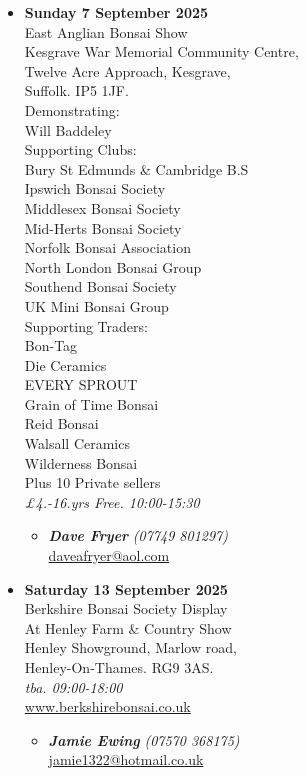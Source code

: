 \begin{itemize}
    \item \textbf{Sunday 7 September 2025}
    \\
    East Anglian Bonsai Show \\
    Kesgrave War Memorial Community Centre, \\
    Twelve Acre Approach, Kesgrave, \\
    Suffolk. IP5 1JF. \\
    Demonstrating: \\
    Will Baddeley \\
    Supporting Clubs: \\
    Bury St Edmunds \& Cambridge B.S \\
    Ipswich Bonsai Society \\
    Middlesex Bonsai Society \\
    Mid-Herts Bonsai Society \\
    Norfolk Bonsai Association \\
    North London Bonsai Group \\
    Southend Bonsai Society \\
    UK Mini Bonsai Group \\
    Supporting Traders: \\
    Bon-Tag \\
    Die Ceramics \\
    EVERY SPROUT \\
    Grain of Time Bonsai \\
    Reid Bonsai \\
    Walsall Ceramics \\
    Wilderness Bonsai \\
    Plus 10 Private sellers
    \\
    \emph{£4.-16.yrs Free. 10:00-15:30}
    \begin{itemize}
        \item \textbf{\emph{Dave Fryer}} \emph{(07749 801297)} \\
        \href{mailto:daveafryer@aol.com}{daveafryer@aol.com} 
    \end{itemize}

    \item \textbf{Saturday 13 September 2025}
    \\
    Berkshire Bonsai Society Display \\
    At Henley Farm \& Country Show \\
    Henley Showground, Marlow road, \\
    Henley-On-Thames. RG9 3AS.
    \\
    \emph{tba. 09:00-18:00}
    \\
    \href{http://www.berkshirebonsai.co.uk/}{www.berkshirebonsai.co.uk}
    \begin{itemize}
        \item \textbf{\emph{Jamie Ewing}} \emph{(07570 368175)} \\
        \href{mailto:jamie1322@hotmail.co.uk}{jamie1322@hotmail.co.uk} 
    \end{itemize}


\end{itemize}
